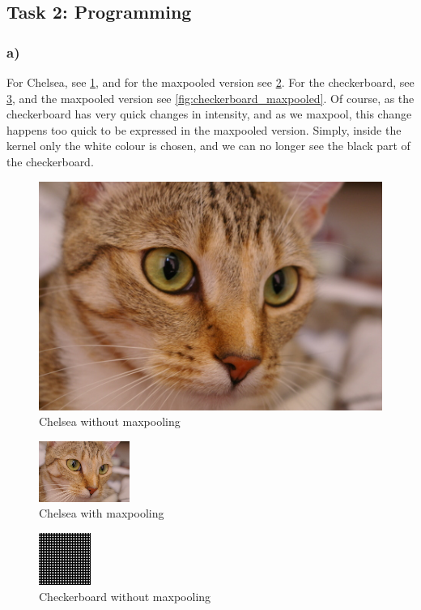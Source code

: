 \newpage
\subsection{Task 2: Programming}

\subsubsection*{a)}
For Chelsea, see \cref{fig:chelsea_original}, and for the maxpooled version see \cref{fig:chelsea_maxpooled}. For the checkerboard, see \cref{fig:checkerboard_original}, and the maxpooled version see \cref{fig:checkerboard_maxpooled}. Of course, as the checkerboard has very quick changes in intensity, and as we maxpool, this change happens too quick to be expressed in the maxpooled version. Simply, inside the kernel only the white colour is chosen, and we can no longer see the black part of the checkerboard. 

\begin{figure}[]
    \centering
    \includegraphics{figures/image_processed/chelsea.png}
    \caption{Chelsea without maxpooling}
    \label{fig:chelsea_original}
\end{figure}

\begin{figure}[]
    \centering
    \includegraphics{figures/image_processed/chelsea_maxpooled.png}
    \caption{Chelsea with maxpooling}
    \label{fig:chelsea_maxpooled}
\end{figure}

\begin{figure}[]
    \centering
    \includegraphics{figures/image_processed/checkerboard.png}
    \caption{Checkerboard without maxpooling}
    \label{fig:checkerboard_original}
\end{figure}

